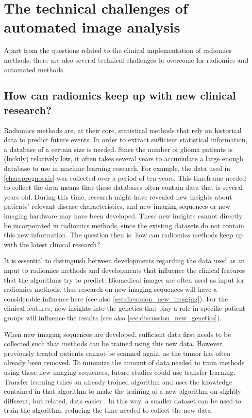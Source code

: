 \section{The technical challenges of automated image analysis}\label{sec:discussion_technical}

Apart from the questions related to the clinical implementation of radiomics methods, there are also several technical challenges to overcome for radiomics and automated methods.

\subsection{How can radiomics keep up with new clinical research?}\label{subsec:discussion_new_research}

Radiomics methods are, at their core, statistical methods that rely on historical data to predict future events.
In order to extract sufficient statistical information, a database of a certain size is needed.
Since the number of glioma patients is (luckily) relatively low, it often takes several years to accumulate a large enough database to use in machine learning research.
For example, the data used in \cref{chap:prognosais} was collected over a period of ten years.
This timeframe needed to collect the data means that these databases often contain data that is several years old.
During this time, research might have revealed new insights about patients' relevant disease characteristics, and new imaging sequences or new imaging hardware may have been developed.
These new insights cannot directly be incorporated in radiomics methods, since the existing datasets do not contain this new information.
The question then is: how can radiomics methods keep up with the latest clinical research?

It is essential to distinguish between developments regarding the data used as an input to radiomics methods and developments that influence the clinical features that the algorithms try to predict.
Biomedical images are often used as input for radiomics methods, thus research on new imaging sequences will have a considerable influence here (see also \cref{sec:dicussion_new_imaging}).
For the clinical features, new insights into the genetics that play a role in specific patient groups will influence the results (see also \cref{sec:discussion_new_genetics}).

When new imaging sequences are developed, sufficient data first needs to be collected such that methods can be trained using this new data.
However, previously treated patients cannot be scanned again, as the \gls{tumor} has often already been removed.
To minimize the amount of data needed to train methods using these new imaging sequences, future studies could use transfer learning.
Transfer learning takes an already trained algorithm and uses the knowledge contained in that algorithm to make the training of a new algorithm on slightly different, but related, data easier \autocite{shin2016deep}.
In this way, a smaller dataset can be used to train the algorithm, reducing the time needed to collect the new data.

